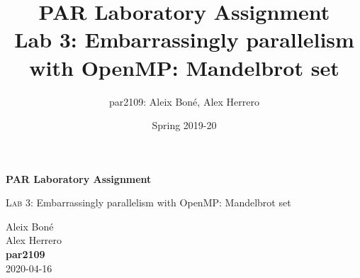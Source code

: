 

\usepackage{caption}
\usepackage{subcaption}
\usepackage{graphicx}
\usepackage{enumitem}
\usepackage{lipsum}

\usepackage{siunitx}
\usepackage{hyphenat}

\usepackage{xcolor}

\usepackage{minted}

\renewcommand\theadfont{\bfseries}

\title{
    PAR Laboratory Assignment\\
    Lab 3: Embarrassingly parallelism with OpenMP: Mandelbrot set
}

\author{
    par2109:
    Aleix Boné,
    Alex Herrero
}

\date{
    Spring 2019-20
}



\thispagestyle{empty}
\clearpage
\setcounter{page}{-1}

\begin{titlepage}
{
    \centering
    \null
    \vfill
    {\Huge \bfseries PAR Laboratory Assignment\par}
    \vspace{3em}
    {\Large {\scshape Lab 3:} Embarrassingly parallelism with OpenMP: Mandelbrot set \par}
    \vfill
\begin{center}
\end{center}
    \vspace{3cm}

    \vfill
    {\raggedleft \Large
        Aleix Boné\\
        Alex Herrero\\
        {\bfseries\ttfamily par2109}\\
        \vspace{4em}
        2020-04-16
        \par}
}
\end{titlepage}


%

